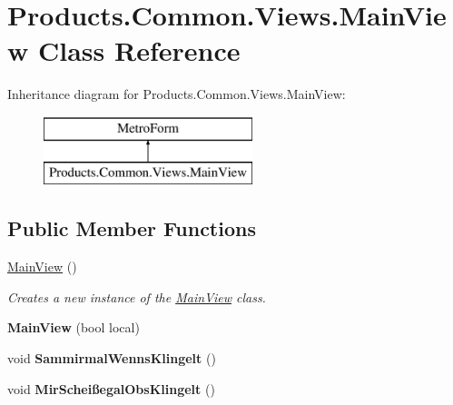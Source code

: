 \hypertarget{class_products_1_1_common_1_1_views_1_1_main_view}{}\section{Products.\+Common.\+Views.\+Main\+View Class Reference}
\label{class_products_1_1_common_1_1_views_1_1_main_view}
Inheritance diagram for Products.\+Common.\+Views.\+Main\+View\+:\begin{figure}[H]
\begin{center}
\leavevmode
\includegraphics[height=2.000000cm]{class_products_1_1_common_1_1_views_1_1_main_view}
\end{center}
\end{figure}
\subsection*{Public Member Functions}
\begin{DoxyCompactItemize}
\item 
\hyperlink{class_products_1_1_common_1_1_views_1_1_main_view_a2cbf37fae159c11b54b8af787ed92159}{Main\+View} ()
\begin{DoxyCompactList}\small\item\em Creates a new instance of the \hyperlink{class_products_1_1_common_1_1_views_1_1_main_view}{Main\+View} class. \end{DoxyCompactList}\item 
{\bfseries Main\+View} (bool local)\hypertarget{class_products_1_1_common_1_1_views_1_1_main_view_a632ed2ab9c47335ff708b5b7ae936205}{}\label{class_products_1_1_common_1_1_views_1_1_main_view_a632ed2ab9c47335ff708b5b7ae936205}

\item 
void {\bfseries Sammirmal\+Wenns\+Klingelt} ()\hypertarget{class_products_1_1_common_1_1_views_1_1_main_view_ada0bb93bf789abb6175acd93b4876631}{}\label{class_products_1_1_common_1_1_views_1_1_main_view_ada0bb93bf789abb6175acd93b4876631}

\item 
void {\bfseries Mir\+Scheißegal\+Obs\+Klingelt} ()\hypertarget{class_products_1_1_common_1_1_views_1_1_main_view_a920e1cc7f658f974e440793e8a27af94}{}\label{class_products_1_1_common_1_1_views_1_1_main_view_a920e1cc7f658f974e440793e8a27af94}

\end{DoxyCompactItemize}
